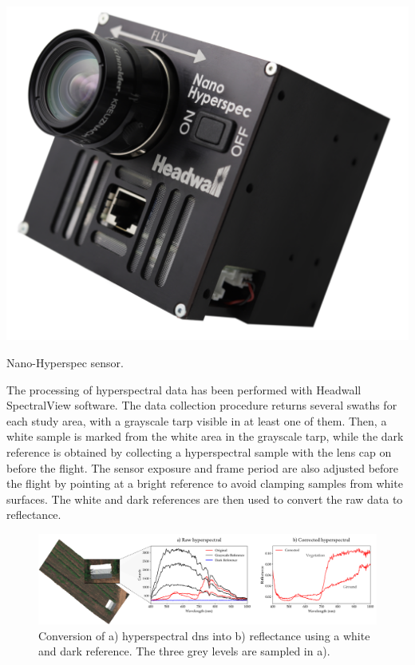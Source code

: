 \begin{marginfigure}[-3.0cm]
	\includegraphics{figs/materials/nano_hyperspec.png}
	\caption{Nano-Hyperspec sensor.}
	\label{fig:nano_hyperspec}
\end{marginfigure}

The processing of hyperspectral data has been performed with Headwall SpectralView\texttrademark \hspace{1mm} software. The data collection procedure returns several swaths for each study area, with a grayscale tarp visible in at least one of them. Then, a white sample is marked from the white area in the grayscale tarp, while the dark reference is obtained by collecting a hyperspectral sample with the lens cap on before the flight. The sensor exposure and frame period are also adjusted before the flight by pointing at a bright reference to avoid clamping samples from white surfaces. The white and dark references are then used to convert the raw data to reflectance. 

\begin{figure}[ht]
    \centering
    \includegraphics{figs/materials/spectral_view_rectification.png}
    \caption{Conversion of a) hyperspectral \acrshort{dn}s into b) reflectance using a white and dark reference. The three grey levels are sampled in a).}
    \label{fig:hyperspectral_rectification}
\end{figure}


